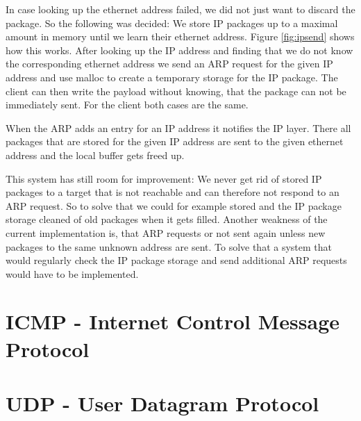 In case looking up the ethernet address failed, we did not just want to discard the package. So the following was decided: We store IP packages up to a maximal amount in memory until we learn their ethernet address. Figure \ref{fig:ipsend} shows how this works. After looking up the IP address and finding that we do not know the corresponding ethernet address we send an ARP request for the given IP address and use malloc to create a temporary storage for the IP package. The client can then write the payload without knowing, that the package can not be immediately sent. For the client both cases are the same.

When the ARP adds an entry for an IP address it notifies the IP layer. There all packages that are stored for the given IP address are sent to the given ethernet address and the local buffer gets freed up.

This system has still room for improvement: We never get rid of stored IP packages to a target that is not reachable and can therefore not respond to an ARP request. So to solve that we could for example stored and the IP package storage cleaned of old packages when it gets filled. Another weakness of the current implementation is, that ARP requests or not sent again unless new packages to the same unknown address are sent. To solve that a system that would regularly check the IP package storage and send additional ARP requests would have to be implemented.

\section{ICMP - Internet Control Message Protocol}

\section{UDP - User Datagram Protocol}

